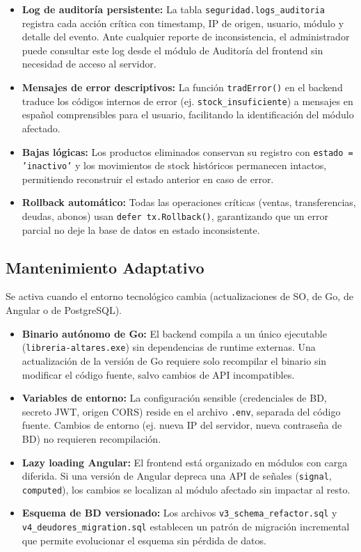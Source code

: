 \documentclass[12pt,a4paper,oneside]{report}
\begin{document}
\begin{itemize}[leftmargin=1.5cm]
  \item \textbf{Log de auditoría persistente:} La tabla \texttt{seguridad.logs\_auditoria} registra cada acción crítica con timestamp, IP de origen, usuario, módulo y detalle del evento. Ante cualquier reporte de inconsistencia, el administrador puede consultar este log desde el módulo de Auditoría del frontend sin necesidad de acceso al servidor.
  \item \textbf{Mensajes de error descriptivos:} La función \texttt{tradError()} en el backend traduce los códigos internos de error (ej. \texttt{stock\_insuficiente}) a mensajes en español comprensibles para el usuario, facilitando la identificación del módulo afectado.
  \item \textbf{Bajas lógicas:} Los productos eliminados conservan su registro con \texttt{estado = 'inactivo'} y los movimientos de stock históricos permanecen intactos, permitiendo reconstruir el estado anterior en caso de error.
  \item \textbf{Rollback automático:} Todas las operaciones críticas (ventas, transferencias, deudas, abonos) usan \texttt{defer tx.Rollback()}, garantizando que un error parcial no deje la base de datos en estado inconsistente.
\end{itemize}

\subsection{Mantenimiento Adaptativo}

Se activa cuando el entorno tecnológico cambia (actualizaciones de SO, de Go, de Angular o de PostgreSQL).

\begin{itemize}[leftmargin=1.5cm]
  \item \textbf{Binario autónomo de Go:} El backend compila a un único ejecutable (\texttt{libreria-altares.exe}) sin dependencias de runtime externas. Una actualización de la versión de Go requiere solo recompilar el binario sin modificar el código fuente, salvo cambios de API incompatibles.
  \item \textbf{Variables de entorno:} La configuración sensible (credenciales de BD, secreto JWT, origen CORS) reside en el archivo \texttt{.env}, separada del código fuente. Cambios de entorno (ej. nueva IP del servidor, nueva contraseña de BD) no requieren recompilación.
  \item \textbf{Lazy loading Angular:} El frontend está organizado en módulos con carga diferida. Si una versión de Angular depreca una API de señales (\texttt{signal}, \texttt{computed}), los cambios se localizan al módulo afectado sin impactar al resto.
  \item \textbf{Esquema de BD versionado:} Los archivos \texttt{v3\_schema\_refactor.sql} y \texttt{v4\_deudores\_migration.sql} establecen un patrón de migración incremental que permite evolucionar el esquema sin pérdida de datos.
\end{itemize}
\end{document}
